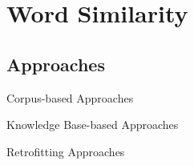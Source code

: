 \documentclass[fullname]{clv2}
\begin{document}
\section{Word Similarity}

\subsection{Approaches}

Corpus-based Approaches
\begin{enumerate*}
\item \cite{Landauer:1997}
\item \cite{turney2001mining}
\item \cite{turney2003combining}
\item \cite{bullinaria:2007}
\item \cite{Zeschetal:2008}
\item \cite{bullinaria2012extracting}
\item \cite{mikolov2013efficient,mikolov2013distributed,mikolov2013linguistic}
\item \cite{baroni2014don}
\item \cite{levy2014dependencybased}
\item \cite{levy2014neural}
\item \cite{pennington2014glove}
\item \cite{levy2015improving}
\item \cite{vilnis2015word}
\item \cite{AAAI159314}
\item \cite{li2015multi}

\end{enumerate*}

\noindent Knowledge Base-based Approaches
\begin{enumerate*}
\item \cite{strube2006wikirelate}
\item \cite{gabrilovich2007computing}
\item \cite{hughes2007lexical}
\item \cite{yeh2009wikiwalk}
\item \cite{agirre2009study}
\item \cite{Pilehvaretal:2013}
\item \cite{faruqui2015non}

\end{enumerate*}


\noindent Retrofitting Approaches
\begin{enumerate*}
\item \cite{goikoetxea2015random}
\item \cite{faruqui2015retrofitting}
\item \cite{iacobacci2015sensembed}
\end{enumerate*}
\end{document}
